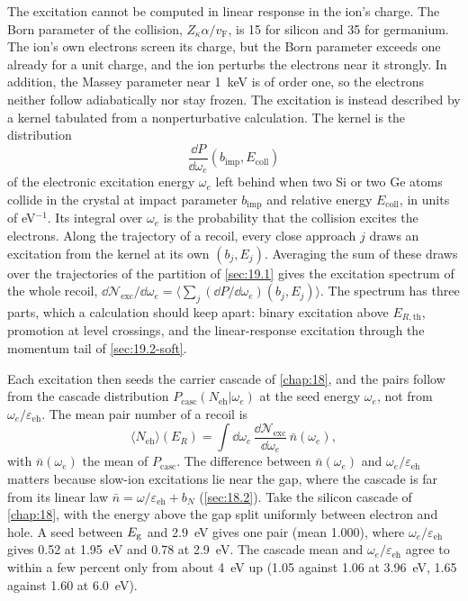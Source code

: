 The excitation cannot be computed in linear response in the ion's charge. The Born parameter of the collision, $Z_\kappa\alpha/v_{\mathrm{F}}$, is 15 for silicon and 35 for germanium. The ion's own electrons screen its charge, but the Born parameter exceeds one already for a unit charge, and the ion perturbs the electrons near it strongly. In addition, the Massey parameter near \SI{1}{keV} is of order one, so the electrons neither follow adiabatically nor stay frozen. The excitation is instead described by a kernel tabulated from a nonperturbative calculation. The kernel is the distribution
\begin{equation}
  \frac{\dd P}{\dd\omega_e}(b_{\mathrm{imp}}, E_{\mathrm{coll}})
  \label{eq:19.2-kernel}
\end{equation}
of the electronic excitation energy $\omega_e$ left behind when two Si or two Ge atoms collide in the crystal at impact parameter $b_{\mathrm{imp}}$ and relative energy $E_{\mathrm{coll}}$, in units of eV$^{-1}$. Its integral over $\omega_e$ is the probability that the collision excites the electrons. Along the trajectory of a recoil, every close approach $j$ draws an excitation from the kernel at its own $(b_j, E_j)$. Averaging the sum of these draws over the trajectories of the partition of \cref{sec:19.1} gives the excitation spectrum of the whole recoil, $\dd\mathcal{N}_{\mathrm{exc}}/\dd\omega_e = \langle\sum_j(\dd P/\dd\omega_e)(b_j, E_j)\rangle$. The spectrum has three parts, which a calculation should keep apart: binary excitation above $E_{R,\mathrm{th}}$, promotion at level crossings, and the linear-response excitation through the momentum tail of \cref{sec:19.2-soft}.

Each excitation then seeds the carrier cascade of \cref{chap:18}, and the pairs follow from the cascade distribution $P_{\mathrm{casc}}(N_{\mathrm{eh}}|\omega_e)$ at the seed energy $\omega_e$, not from $\omega_e/\varepsilon_{\mathrm{eh}}$. The mean pair number of a recoil is
\begin{equation}
  \langle N_{\mathrm{eh}}\rangle(E_R) = \int\dd\omega_e\,\frac{\dd\mathcal{N}_{\mathrm{exc}}}{\dd\omega_e}\,\bar n(\omega_e) ,
  \label{eq:19.2-charge}
\end{equation}
with $\bar n(\omega_e)$ the mean of $P_{\mathrm{casc}}$. The difference between $\bar n(\omega_e)$ and $\omega_e/\varepsilon_{\mathrm{eh}}$ matters because slow-ion excitations lie near the gap, where the cascade is far from its linear law $\bar n = \omega/\varepsilon_{\mathrm{eh}} + b_N$ (\cref{sec:18.2}). Take the silicon cascade of \cref{chap:18}, with the energy above the gap split uniformly between electron and hole. A seed between $E_{\mathrm{g}}$ and \SI{2.9}{eV} gives one pair (mean 1.000), where $\omega_e/\varepsilon_{\mathrm{eh}}$ gives 0.52 at \SI{1.95}{eV} and 0.78 at \SI{2.9}{eV}. The cascade mean and $\omega_e/\varepsilon_{\mathrm{eh}}$ agree to within a few percent only from about \SI{4}{eV} up (1.05 against 1.06 at \SI{3.96}{eV}, 1.65 against 1.60 at \SI{6.0}{eV}).

